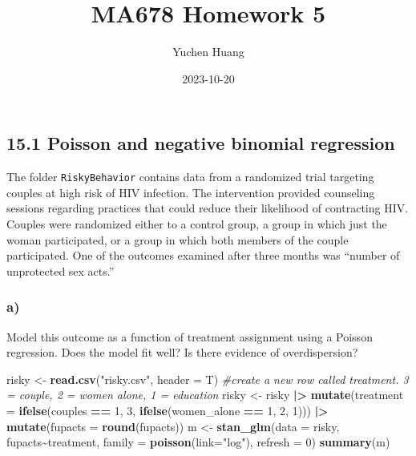 \documentclass[
]{article}
\title{MA678 Homework 5}
\author{Yuchen Huang}
\date{2023-10-20}
\newenvironment{Shaded}{\begin{snugshade}}{\end{snugshade}}
\newcommand{\AttributeTok}[1]{\textcolor[rgb]{0.13,0.29,0.53}{#1}}
\newcommand{\CommentTok}[1]{\textcolor[rgb]{0.56,0.35,0.01}{\textit{#1}}}
\newcommand{\DecValTok}[1]{\textcolor[rgb]{0.00,0.00,0.81}{#1}}
\newcommand{\FunctionTok}[1]{\textcolor[rgb]{0.13,0.29,0.53}{\textbf{#1}}}
\newcommand{\NormalTok}[1]{#1}
\newcommand{\OtherTok}[1]{\textcolor[rgb]{0.56,0.35,0.01}{#1}}
\newcommand{\SpecialCharTok}[1]{\textcolor[rgb]{0.81,0.36,0.00}{\textbf{#1}}}
\newcommand{\StringTok}[1]{\textcolor[rgb]{0.31,0.60,0.02}{#1}}
\begin{document}
\maketitle

\hypertarget{poisson-and-negative-binomial-regression}{%
\subsection{15.1 Poisson and negative binomial
regression}\label{poisson-and-negative-binomial-regression}}

The folder \texttt{RiskyBehavior} contains data from a randomized trial
targeting couples at high risk of HIV infection. The intervention
provided counseling sessions regarding practices that could reduce their
likelihood of contracting HIV. Couples were randomized either to a
control group, a group in which just the woman participated, or a group
in which both members of the couple participated. One of the outcomes
examined after three months was ``number of unprotected sex acts.''

\hypertarget{a}{%
\subsubsection{a)}\label{a}}

Model this outcome as a function of treatment assignment using a Poisson
regression. Does the model fit well? Is there evidence of
overdispersion?

\begin{Shaded}
\begin{Highlighting}[]
\NormalTok{risky }\OtherTok{\textless{}{-}} \FunctionTok{read.csv}\NormalTok{(}\StringTok{"risky.csv"}\NormalTok{, }\AttributeTok{header =}\NormalTok{ T)}
\CommentTok{\#create a new row called treatment. 3  = couple, 2 = women alone, 1 = education}
\NormalTok{risky }\OtherTok{\textless{}{-}}\NormalTok{ risky }\SpecialCharTok{|\textgreater{}}
    \FunctionTok{mutate}\NormalTok{(}\AttributeTok{treatment =} \FunctionTok{ifelse}\NormalTok{(couples }\SpecialCharTok{==} \DecValTok{1}\NormalTok{, }\DecValTok{3}\NormalTok{, }\FunctionTok{ifelse}\NormalTok{(women\_alone }\SpecialCharTok{==} \DecValTok{1}\NormalTok{, }\DecValTok{2}\NormalTok{, }\DecValTok{1}\NormalTok{))) }\SpecialCharTok{|\textgreater{}}
    \FunctionTok{mutate}\NormalTok{(}\AttributeTok{fupacts =} \FunctionTok{round}\NormalTok{(fupacts))}
\NormalTok{m }\OtherTok{\textless{}{-}}  \FunctionTok{stan\_glm}\NormalTok{(}\AttributeTok{data =}\NormalTok{ risky, fupacts}\SpecialCharTok{\textasciitilde{}}\NormalTok{treatment, }\AttributeTok{family =} \FunctionTok{poisson}\NormalTok{(}\AttributeTok{link=}\StringTok{"log"}\NormalTok{), }\AttributeTok{refresh =} \DecValTok{0}\NormalTok{)}
\FunctionTok{summary}\NormalTok{(m)}
\end{Highlighting}
\end{Shaded}
\end{document}
